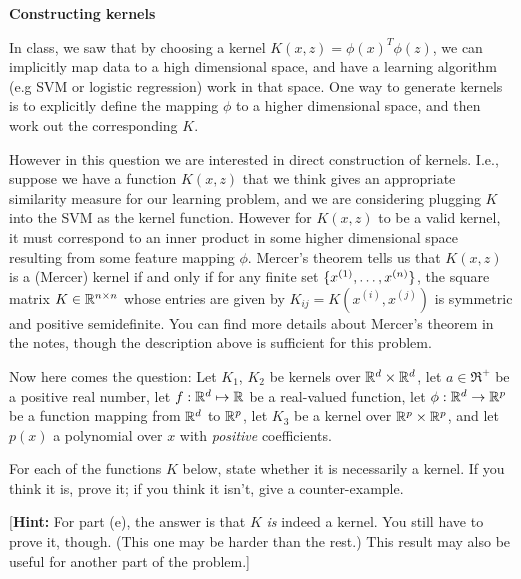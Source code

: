 \item {} {\bf Constructing kernels}

In class, we saw that by choosing a kernel $K(x,z) = \phi(x)^T\phi(z)$, we can
implicitly map data to a high dimensional space, and have a learning algorithm (e.g SVM or logistic regression)
work in that space. One way to generate kernels is to explicitly define the
mapping $\phi$ to a higher dimensional space, and then work out the
corresponding $K$.

However in this question we are interested in direct construction of kernels.
I.e., suppose we have a function $K(x,z)$ that we think gives an appropriate
similarity measure for our learning problem, and we are considering plugging
$K$ into the SVM as the kernel function. However for $K(x,z)$ to be a valid
kernel, it must correspond to an inner product in some higher dimensional space
resulting from some feature mapping $\phi$.  Mercer's theorem tells us that
$K(x,z)$ is a (Mercer) kernel if and only if for any finite set $\{x^{(1)},
\ldots, x^{({n})}\}$, the square matrix $K \in {\mathbb R}^{{n} \times {n}}$ whose entries
are given by $K_{ij} = K(x^{(i)},x^{(j)})$ is symmetric and positive
semidefinite. You can find more details about Mercer's theorem in the notes,
though the description above is sufficient for this problem.

Now here comes the question: Let $K_1$, $K_2$ be kernels over ${\mathbb R}^{{d}} \times
{\mathbb R}^{{d}}$, let $a \in \Re^+$ be a positive real number, let $f : {\mathbb R}^{{d}} \mapsto
{\mathbb R}$ be a real-valued function, let $\phi: {\mathbb R}^{{d}} \rightarrow {\mathbb R}^{p}$ be a
function mapping from ${\mathbb R}^{{d}}$ to ${\mathbb R}^{p}$, let $K_3$ be a kernel over ${\mathbb R}^{p}
\times {\mathbb R}^{p}$, and let $p(x)$ a polynomial over $x$ with \emph{positive}
coefficients.

For each of the functions $K$ below, state whether it is necessarily a
kernel.  If you think it is, prove it; if you think it isn't, give a
counter-example.

[\textbf{Hint:} For part (e), the answer is that $K$ \emph{is} indeed
a kernel. You still have to prove it, though.  (This one may be harder than the
rest.)  This result may also be useful for another part of the problem.]

